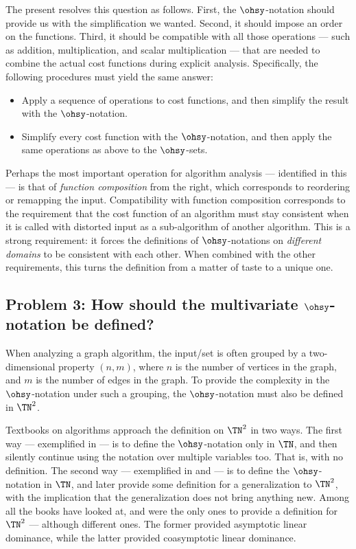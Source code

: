 \documentclass[b5paper, english, oneside]{memoir}
\begin{document}
The present \manuscript{} resolves this question as follows. First, the $\ohsy$-notation should provide us with the simplification we wanted. Second, it should impose an order on the functions. Third, it should be compatible with all those operations --- such as addition, multiplication, and scalar multiplication --- that are needed to combine the actual cost functions during explicit analysis. Specifically, the following procedures must yield the same answer:
\begin{itemize}
\item Apply a sequence of operations to cost functions, and then simplify the result with the $\ohsy$-notation.
\item Simplify every cost function with the $\ohsy$-notation, and then apply the same operations as above to the $\ohsy$-sets.
\end{itemize}

Perhaps the most important operation for algorithm analysis --- identified in this \manuscript{} --- is that of \emph{function composition} from the right, which corresponds to reordering or remapping the input. Compatibility with function composition corresponds to the requirement that the cost function of an algorithm must stay consistent when it is called with distorted input as a sub-algorithm of another algorithm. This is a strong requirement: it forces the definitions of $\ohsy$-notations on \emph{different domains} to be consistent with each other. When combined with the other requirements, this turns the definition from a matter of taste to a unique one.

\subsection{Problem 3: How should the multivariate $\ohsy$-notation be defined?}

When analyzing a graph algorithm, the input\-/set is often grouped by a two-dimensional property $(n, m)$, where $n$ is the number of vertices in the graph, and $m$ is the number of edges in the graph. To provide the complexity in the $\ohsy$-notation under such a grouping, the $\ohsy$-notation must also be defined in $\TN^2$.

Textbooks on algorithms approach the definition on $\TN^2$ in two ways. The first way --- exemplified in \cite[page 312]{DesignAndAnalysisOfComputerAlgorithms} --- is to define the $\ohsy$-notation only in $\TN$, and then silently continue using the notation over multiple variables too. That is, with no definition. The second way --- exemplified in \cite{IntroAlgo} and \cite{IntroAlgo2009} --- is to define the $\ohsy$-notation in $\TN$, and later provide some definition for a generalization to $\TN^2$, with the implication that the generalization does not bring anything new. Among all the books \we{} have looked at, \cite{IntroAlgo} and \cite{IntroAlgo2009} were the only ones to provide a definition for $\TN^2$ --- although different ones. The former provided asymptotic linear dominance, while the latter provided coasymptotic linear dominance.
\end{document}
